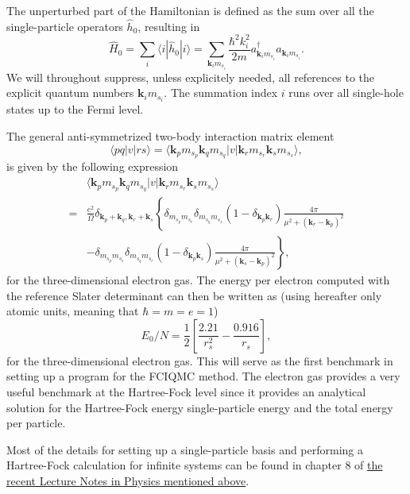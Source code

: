 \documentclass[%
oneside,                 %
final,                   %
10pt]{article}
\begin{document}
The unperturbed part
of the Hamiltonian is defined as the sum over all the single-particle
operators $\hat{h}_0$, resulting in
\[
\hat{H}_{0}=\sum_i\langle i|\hat{h}_0|i \rangle= {\displaystyle\sum_{\mathbf{k}_{i}m_{s_i}}}
\frac{\hbar^{2}k_i^{2}}{2m}a_{\mathbf{k}_{i}m_{s_i}}^{\dagger}
a_{\mathbf{k}_{i}m_{s_i}}.
\]
We will throughout suppress, unless explicitely needed, all references
to the explicit quantum numbers $\mathbf{k}_{i}m_{s_i}$. The summation
index $i$ runs over all single-hole states up to the Fermi level.

The general anti-symmetrized two-body interaction matrix element 
\[
\langle pq |v| r s \rangle = \langle
\mathbf{k}_{p}m_{s_{p}}\mathbf{k}_{q}m_{s_{q}}|v|\mathbf{k}_{r}m_{s_{r}}\mathbf{k}_{s}m_{s_{s}}\rangle,
\]
is given by the following expression
  \begin{align}
    & \langle
    \mathbf{k}_{p}m_{s_{p}}\mathbf{k}_{q}m_{s_{q}}|v|\mathbf{k}_{r}m_{s_{r}}\mathbf{k}_{s}m_{s_{s}}\rangle
    \nonumber \\ =&
    \frac{e^{2}}{\Omega}\delta_{\mathbf{k}_{p}+\mathbf{k}_{q},
      \mathbf{k}_{r}+\mathbf{k}_{s}}\left\{
    \delta_{m_{s_{p}}m_{s_{r}}}\delta_{m_{s_{q}}m_{s_{s}}}(1-\delta_{\mathbf{k}_{p}\mathbf{k}_{r}})\frac{4\pi
    }{\mu^{2} + (\mathbf{k}_{r}-\mathbf{k}_{p})^{2}} \right. \nonumber
    \\ & \left. -
    \delta_{m_{s_{p}}m_{s_{s}}}\delta_{m_{s_{q}}m_{s_{r}}}(1-\delta_{\mathbf{k}_{p}\mathbf{k}_{s}})\frac{4\pi
    }{\mu^{2} + (\mathbf{k}_{s}-\mathbf{k}_{p})^{2}} \right\},
    \nonumber
  \end{align}
for the three-dimensional electron gas.  The energy per electron computed with
the reference Slater determinant can then be written as 
(using hereafter only atomic units, meaning that $\hbar = m = e = 1$)
\[
E_0/N=\frac{1}{2}\left[\frac{2.21}{r_s^2}-\frac{0.916}{r_s}\right],
\]
for the three-dimensional electron gas.  This will serve as the first benchmark in setting up a
program for the FCIQMC method. 
The electron gas provides a very useful benchmark at the Hartree-Fock level since it provides
an analytical solution for the Hartree-Fock energy single-particle energy and the total  energy per particle. 

Most of the details for setting up a single-particle basis and performing a Hartree-Fock calculation for infinite systems can be found in chapter 8 of \href{{https://github.com/ManyBodyPhysics/LectureNotesPhysics/blob/master/doc/src/lnp.pdf}}{the recent Lecture Notes in Physics mentioned above}.
\end{document}
